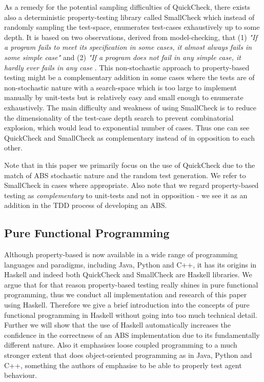 As a remedy for the potential sampling difficulties of QuickCheck, there exists also a deterministic property-testing library called SmallCheck \cite{runciman_smallcheck_2008} which instead of randomly sampling the test-space, enumerates test-cases exhaustively up to some depth. It is based on two observations, derived from model-checking, that (1) \textit{"If a program fails to meet its specification in some cases, it almost always fails in some simple case"} and (2) \textit{"If a program does not fail in any simple case, it hardly ever fails in any case} \cite{runciman_smallcheck_2008}. This non-stochastic approach to property-based testing might be a complementary addition in some cases where the tests are of non-stochastic nature with a search-space which is too large to implement manually by unit-tests but is relatively easy and small enough to enumerate exhaustively. The main difficulty and weakness of using SmallCheck is to reduce the dimensionality of the test-case depth search to prevent combinatorial explosion, which would lead to exponential number of cases. Thus one can see QuickCheck and SmallCheck as complementary instead of in opposition to each other.

Note that in this paper we primarily focus on the use of QuickCheck due to the match of ABS stochastic nature and the random test generation. We refer to SmallCheck in cases where appropriate. Also note that we regard property-based testing as \textit{complementary} to unit-tests and not in opposition - we see it as an addition in the TDD process of developing an ABS.

\subsection{Pure Functional Programming}
Although property-based is now available in a wide range of programming languages and paradigms, including Java, Python and C++, it has its origins in Haskell and indeed both QuickCheck and SmallCheck are Haskell libraries. We argue that for that reason property-based testing really shines in pure functional programming, thus we conduct all implementation and research of this paper using Haskell. Therefore we give a brief introduction into the concepts of pure functional programming in Haskell without going into too much technical detail. Further we will show that the use of Haskell automatically increases the confidence in the correctness of an ABS implementation due to its fundamentally different nature. Also it emphasises loose coupled programming to a much stronger extent that does object-oriented programming as in Java, Python and C++, something the authors of \cite{collier_test-driven_2013} emphasise to be able to properly test agent behaviour.

